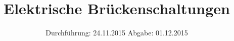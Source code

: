 
\usepackage[frak=boondox]{mathalfa}
\subject{302}
\title{Elektrische Brückenschaltungen}
\date{
  Durchführung: 24.11.2015
  \hspace{3em}
  Abgabe: 01.12.2015
}



\maketitle
\newpage
\mbox{}
\newpage
\thispagestyle{empty}
\tableofcontents
\newpage





\nocite{*}
\printbibliography



